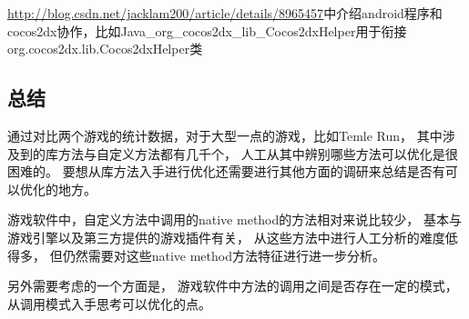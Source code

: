 \url{http://blog.csdn.net/jacklam200/article/details/8965457}中介绍android程序和cocos2dx协作，比如Java\_org\_cocos2dx\_lib\_Cocos2dxHelper用于衔接org.cocos2dx.lib.Cocos2dxHelper类
 
\subsection{总结}
\label{sec:dexanalysis:conclusion}
通过对比两个游戏的统计数据，对于大型一点的游戏，比如Temle Run，
其中涉及到的库方法与自定义方法都有几千个，
人工从其中辨别哪些方法可以优化是很困难的。
要想从库方法入手进行优化还需要进行其他方面的调研来总结是否有可以优化的地方。

游戏软件中，自定义方法中调用的native method的方法相对来说比较少，
基本与游戏引擎以及第三方提供的游戏插件有关，
从这些方法中进行人工分析的难度低得多，
但仍然需要对这些native method方法特征进行进一步分析。

另外需要考虑的一个方面是，
游戏软件中方法的调用之间是否存在一定的模式，
从调用模式入手思考可以优化的点。


